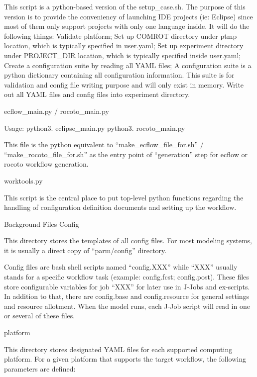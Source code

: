 This script is a python-\/based version of the setup\-\_\-case.\-sh. The purpose of this version is to provide the conveniency of launching I\-D\-E projects (ie\-: Eclipse) since most of them only support projects with only one language inside. It will do the following things\-: Validate platform; Set up C\-O\-M\-R\-O\-T directory under ptmp location, which is typically specified in user.\-yaml; Set up experiment directory under P\-R\-O\-J\-E\-C\-T\-\_\-\-D\-I\-R location, which is typically specified inside user.\-yaml; Create a configuration suite by reading all Y\-A\-M\-L files; A configuration suite is a python dictionary containing all configuration information. This suite is for validation and config file writing purpose and will only exist in memory. Write out all Y\-A\-M\-L files and config files into experiment directory.

ecflow\-\_\-main.\-py / rocoto\-\_\-main.\-py

Usage\-: python3. eclipse\-\_\-main.\-py python3. rocoto\-\_\-main.\-py

This file is the python equivalent to “make\-\_\-ecflow\-\_\-file\-\_\-for.\-sh” / “make\-\_\-rocoto\-\_\-file\-\_\-for.\-sh” as the entry point of “generation” step for ecflow or rocoto workflow generation.

worktools.\-py

This script is the central place to put top-\/level python functions regarding the handling of configuration definition documents and setting up the workflow.

Background Files Config

This directory stores the templates of all config files. For most modeling systems, it is usually a direct copy of “parm/config” directory.

Config files are bash shell scripts named “config.\-X\-X\-X” while “\-X\-X\-X” usually stands for a specific workflow task (example\-: config.\-fcst; config.\-post). These files store configurable variables for job “\-X\-X\-X” for later use in J-\/\-Jobs and ex-\/scripts. In addition to that, there are config.\-base and config.\-resource for general settings and resource allotment. When the model runs, each J-\/\-Job script will read in one or several of these files.

platform

This directory stores designated Y\-A\-M\-L files for each supported computing platform. For a given platform that supports the target workflow, the following parameters are defined\-:

